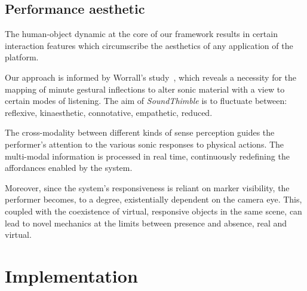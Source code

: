 \subsection{Performance aesthetic}
\label{sec:aesthetic}

The human-object dynamic at the core of our framework results in certain interaction features which circumscribe the aesthetics of any application of the platform.

Our approach is informed by Worrall's study~\cite{worrall2013understanding}, which reveals a necessity for the mapping of minute gestural inflections to alter sonic material with a view to certain modes of listening. The aim of \textit{SoundThimble} is to fluctuate between: reflexive, kinaesthetic, connotative, empathetic, reduced.

The cross-modality between different kinds of sense perception guides the performer's attention to the various sonic responses to physical actions. The multi-modal information is processed in real time, continuously redefining the affordances enabled by the system.

Moreover, since the system's responsiveness is reliant on marker visibility, the performer becomes, to a degree, existentially dependent on the camera eye. This, coupled with the coexistence of virtual, responsive objects in the same scene, can lead to novel mechanics at the limits between presence and absence, real and virtual.

\section{Implementation}
\label{sec:implem}



